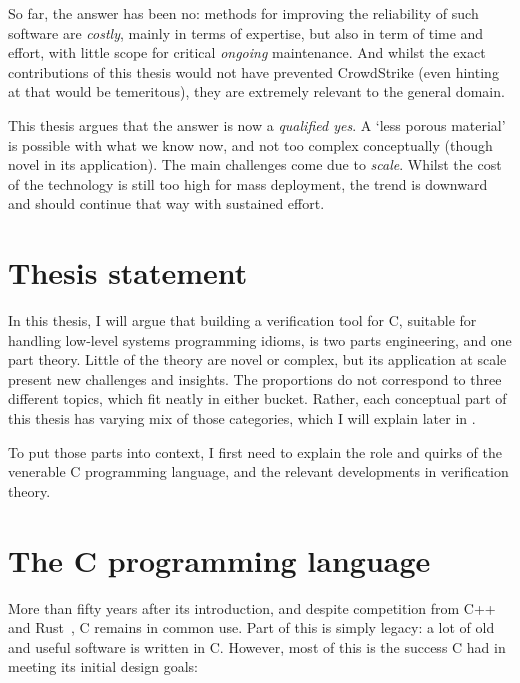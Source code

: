 So far, the answer has been no: methods for improving the reliability of such
software are \emph{costly}, mainly in terms of expertise, but also in term of
time and effort, with little scope for critical \emph{ongoing} maintenance. And
whilst the exact contributions of this thesis would not have prevented
CrowdStrike (even hinting at that would be temeritous), they are extremely
relevant to the general domain.

This thesis argues that the answer is now a \emph{qualified yes}. A `less
porous material' is possible with what we know now, and not too complex
conceptually (though novel in its application). The main challenges come due to
\emph{scale}. Whilst the cost of the technology is still too high for mass
deployment, the trend is downward and should continue that way with sustained
effort.


\section{Thesis statement}

In this thesis, I will argue that building a verification tool for C, suitable
for handling low-level systems programming idioms, is two parts engineering,
and one part theory. Little of the theory are novel or complex, but its
application at scale present new challenges and insights. The proportions do
not correspond to three different topics, which fit neatly in either bucket.
Rather, each conceptual part of this thesis has varying mix of those
categories, which I will explain later in .

To put those parts into context, I first need to explain the role and quirks of
the venerable C programming language, and the relevant developments in
verification theory.

\section{The C programming language}\label{sec:c-lang}

More than fifty years after its introduction, and despite competition from
C++~ and Rust~, C remains in common use. Part
of this is simply legacy: a lot of old and useful software is written in C.
However, most of this is the success C had in meeting its initial design goals:

